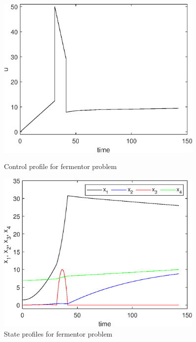 \begin{figure}[htb]
	\begin{minipage}[t]{0.5\linewidth}
		\centering
		\includegraphics[width=0.9\textwidth]{examples/problem-fermentor/graphs/fermentor_control.eps}
		\caption[Problem 6: Control profile]{Control profile for fermentor problem}
		\label{fig:prob_fermentor_u} 
	\end{minipage}
	\begin{minipage}[t]{0.5\linewidth}
		\centering
		\includegraphics[width=0.9\textwidth]{examples/problem-fermentor/graphs/fermentor_states.eps}
		\caption[Problem 6: State profiles]{State profiles for fermentor problem}
		\label{fig:prob_fermentor_x}  
	\end{minipage}
\end{figure}
